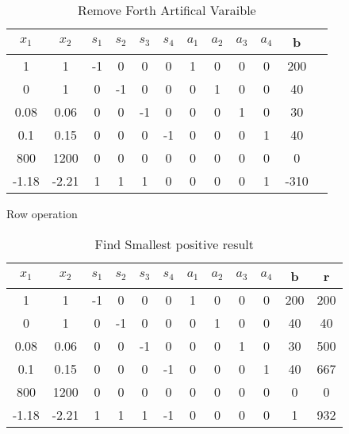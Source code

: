 \documentclass{article}
\begin{document}
  \begin{table}[H]
  \centering
  \caption{Remove Forth Artifical Varaible}
  \label{my-label}
  \begin{tabular}{|c|c|c|c|c|c|c|c|c|c|c|c|}
  \hline
  $x_1$ & $x_2$ & $s_1$  & $s_2$ & $s_3$ & $s_4$ & $a_1$ & $a_2$ & $a_3$ & $a_4$ & b  \\ \hline
  1    & 1    & -1       & 0    & 0    & 0    & 1    & 0    & 0    & 0 & 200 \\ \hline
  0    & 1    & 0        & -1   & 0    & 0    & 0    & 1    & 0    & 0 & 40  \\ \hline
  0.08 & 0.06 & 0        & 0    & -1   & 0    & 0    & 0    & 1    & 0 & 30  \\ \hline
  0.1  & 0.15 & 0        & 0    & 0    & -1   & 0    & 0    & 0    & 1 & 40  \\ \hline
  800  & 1200 & 0        & 0    & 0    & 0    & 0    & 0    & 0    & 0 & 0   \\ \hline
  -1.18 & -2.21  & 1     & 1    & 1    & 0    & 0    & 0    & 0    & 1 & -310   \\ \hline
  \end{tabular}
  \end{table}

  Row operation

  \begin{table}[H]
  \centering
  \caption{Find Smallest positive result}
  \label{my-label}
  \begin{tabular}{|c|c|c|c|c|c|c|c|c|c|c|c|}
  \hline
  $x_1$ & $x_2$ & $s_1$  & $s_2$ & $s_3$ & $s_4$ & $a_1$ & $a_2$ & $a_3$ & $a_4$ & b & r  \\ \hline
  1    & 1    & -1       & 0    & 0    & 0    & 1    & 0    & 0    & 0 & 200  & 200\\ \hline
  0    & 1    & 0        & -1   & 0    & 0    & 0    & 1    & 0    & 0 & 40   & 40\\ \hline
  0.08 & 0.06 & 0        & 0    & -1   & 0    & 0    & 0    & 1    & 0 & 30   & 500\\ \hline
  0.1  & 0.15 & 0        & 0    & 0    & -1   & 0    & 0    & 0    & 1 & 40   & 667\\ \hline
  800  & 1200 & 0        & 0    & 0    & 0    & 0    & 0    & 0    & 0 & 0    & 0\\ \hline
  -1.18 & -2.21  & 1     & 1    & 1    & -1   & 0    & 0    & 0    & 0    & 1 & 932   \\ \hline
  \end{tabular}
  \end{table}
\end{document}
